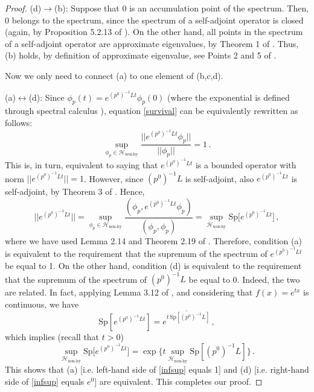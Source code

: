 \documentclass[a4paper, amsfonts, amssymb, amsmath, reprint, showkeys, nofootinbib, twoside, onecolumn,notitlepage,,longbibliography]{revtex4-2}
\theoremstyle{definition}
\theoremstyle{theorem}
\theoremstyle{corollary}
\begin{document}
\begin{proof}
\noindent (d)$\rightarrow$(b): Suppose that $0$ is an accumulation point of the spectrum. Then, $0$ belongs to the spectrum, since the spectrum of a self-adjoint operator is closed (again, by Proposition 5.2.13 of \cite[Chapter 5, \S 5.2]{Pedersenbook}). On the other hand, all points in the spectrum of a self-adjoint operator are approximate eigenvalues, by Theorem 1 of \cite[Lecture 18]{Bhatiabook}. Thus, (b) holds, by definition of approximate eigenvalue, see Points 2 and 5 of \cite[Lecture 17]{Bhatiabook}.

Now we only need to connect (a) to one element of (b,c,d).

\noindent (a)$\leftrightarrow$(d): Since $\phi_p(t)=e^{(p^0)^{-1}L t}\phi_p(0)$ (where the exponential is defined through spectral calculus \cite{Yosidabook}), equation \eqref{survival} can be equivalently rewritten as follows:
\begin{equation}
       \sup_{\phi_p \in \mathcal{H}_{\text{non-hy}}}  \dfrac{||e^{(p^0)^{-1}L t}\phi_p||}{|| \phi_p ||} =1 \, .
\end{equation}
This is, in turn, equivalent to saying that $e^{(p^0)^{-1}L t}$ is a bounded operator with norm $||e^{(p^0)^{-1}L t}||=1$. However, since $(p^0)^{-1}L$ is self-adjoint, also $e^{(p^0)^{-1}L t}$ is self-adjoint, by Theorem 3 of \cite[Chapter XI, \S 12]{Yosidabook}. Hence,
\begin{equation}
    || e^{(p^0)^{-1}L t} ||= \sup_{\phi_p \in \mathcal{H}_{\text{non-hy}}}  \dfrac{(\phi_p, e^{(p^0)^{-1}L t}\phi_p)}{(\phi_p,\phi_p)} = \sup_{\mathcal{H}_{\text{non-hy}}}  \text{Sp} \big[e^{(p^0)^{-1}L t}\big] \, ,
\end{equation}
where we have used Lemma 2.14  and Theorem 2.19 of \cite[Chapter 2]{Teschlbook}. Therefore, condition (a) is equivalent to the requirement that the supremum of the spectrum of $e^{(p^0)^{-1}L t}$ be equal to 1. On the other hand, condition (d) is equivalent to the requirement that the supremum of the spectrum of $(p^0)^{-1}L$ be equal to 0. Indeed, the two are related. In fact, applying Lemma 3.12 of \cite[Chapter 3, \S 3.2]{Teschlbook}, and considering that $f(x)=e^{tx}$ is continuous, we have
\begin{equation}
   \text{Sp}[e^{(p^0)^{-1}L t}]= \overline{e^{t \, \text{Sp}[(p^0)^{-1}L]} } \, ,
\end{equation}
which implies (recall that $t>0$)
\begin{equation}\label{infsup}
  \sup_{\mathcal{H}_{\text{non-hy}}}  \text{Sp} \big[e^{(p^0)^{-1}L t}\big] = \exp \bigg\{ t \sup_{ \mathcal{H}_{\text{non-hy}}} \text{Sp}[(p^0)^{-1}L] \bigg\} \, .  
\end{equation}
This shows that (a) [i.e. left-hand side of \eqref{infsup} equals 1] and (d) [i.e. right-hand side of \eqref{infsup} equals $e^0$] are equivalent. This completes our proof.
\end{proof}
\end{document}
